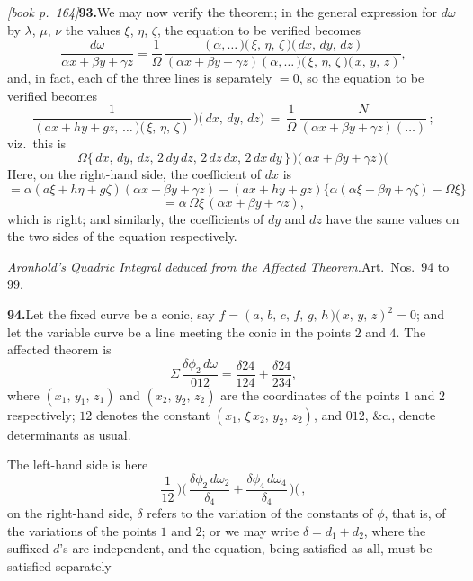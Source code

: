 \documentclass[11pt,a4paper]{article}
\begin{document}
\medskip\noindent\textit{[book p.~164]}\quad \textbf{93.}\quad We may now verify the theorem; in the general expression for $d\omega$ by $\lambda$, $\mu$, $\nu$ the values $\xi$, $\eta$, $\zeta$, the equation to be verified becomes
\[
\frac{d\omega}{\alpha x + \beta y + \gamma z} = \frac{1}{\Omega}\,\frac{(\alpha,\ldots\!\,\mbox{$)\!($}\,\xi,\,\eta,\,\zeta\,\mbox{$)\!($}\,dx,\,dy,\,dz)}{(\alpha x + \beta y + \gamma z)(\alpha,\ldots\!\,\mbox{$)\!($}\,\xi,\,\eta,\,\zeta\,\mbox{$)\!($}\,x,\,y,\,z)},
\]
and, in fact, each of the three lines is separately $= 0$, so the equation to be verified becomes
\[
\frac{1}{(ax + hy + gz,\,\ldots\!\,\mbox{$)\!($}\,\xi,\,\eta,\,\zeta)}\!\,\mbox{$)\!($}\,dx,\,dy,\,dz)
\,=\,\frac{1}{\Omega}\,\frac{N}{(\alpha x + \beta y + \gamma z)(\ldots)}\,;
\]
viz.\ this is
\[
\Omega\bigl\{\,dx,\,dy,\,dz,\,2\,dy\,dz,\,2\,dz\,dx,\,2\,dx\,dy\,\bigr\}\!\,\mbox{$)\!($}\,\alpha x + \beta y + \gamma z\,\mbox{$)\!($}\,
\]
Here, on the right-hand side, the coefficient of $dx$ is
\[
= \alpha(a\xi + h\eta + g\zeta)(\alpha x + \beta y + \gamma z) - (a x + h y + g z)\bigl\{\alpha(\alpha\xi + \beta\eta + \gamma\zeta) - \Omega\xi\bigr\}
\]
\[
= \alpha\,\Omega\xi\,(\alpha x + \beta y + \gamma z),
\]
which is right; and similarly, the coefficients of $dy$ and $dz$ have the same values on the two sides of the equation respectively.

\medskip\noindent\textit{Aronhold's Quadric Integral deduced from the Affected Theorem.}\quad Art.\ Nos.\ 94 to 99.

\medskip\noindent\textbf{94.}\quad Let the fixed curve be a conic, say $f = (a,\,b,\,c,\,f,\,g,\,h\!\,\mbox{$)\!($}\,x,\,y,\,z)^2 = 0$; and let the variable curve be a line meeting the conic in the points $2$ and $4$. The affected theorem is
\[
\Sigma\,\frac{\delta\phi_2\,d\omega}{012} = \frac{\delta 24}{124} + \frac{\delta 24}{234},
\]
where $(x_1,\,y_1,\,z_1)$ and $(x_2,\,y_2,\,z_2)$ are the coordinates of the points $1$ and $2$ respectively; $12$ denotes the constant $(x_1,\,\xi\,x_2,\,y_2,\,z_2)$, and $012$, \&c., denote determinants as usual.

The left-hand side is here
\[
\frac{1}{12}\!\,\mbox{$)\!($}\,\frac{\delta\phi_2\,d\omega_2}{\delta_4} + \frac{\delta\phi_4\,d\omega_4}{\delta_4}\!\,\mbox{$)\!($}\,,
\]
on the right-hand side, $\delta$ refers to the variation of the constants of $\phi$, that is, of the variations of the points $1$ and $2$; or we may write $\delta = d_1 + d_2$, where the suffixed $d$'s are independent, and the equation, being satisfied as all, must be satisfied separately
\end{document}
